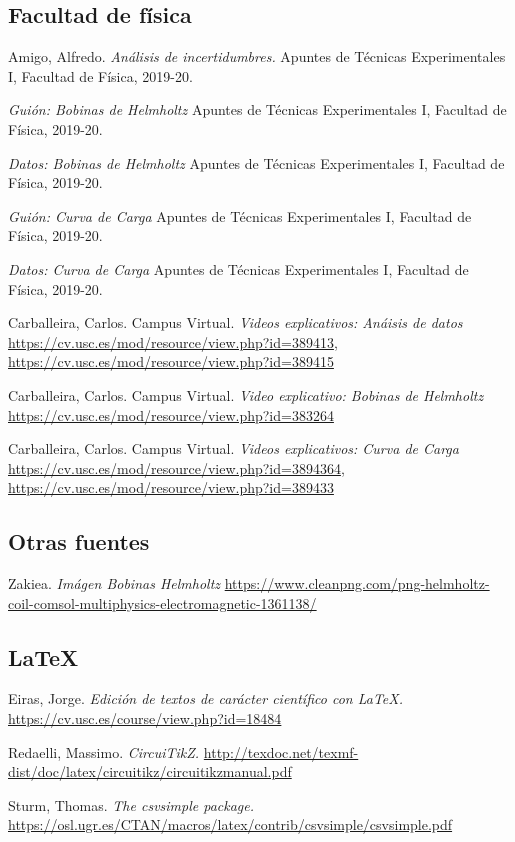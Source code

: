 \documentclass[12pt, a4paper, titlepage]{article}
\begin{document}
  \subsection*{Facultad de física}

  Amigo, Alfredo. \textit{Análisis de incertidumbres.} Apuntes de Técnicas Experimentales I, Facultad de Física, 2019-20.

  \textit{Guión: Bobinas de Helmholtz} Apuntes de Técnicas Experimentales I, Facultad de Física, 2019-20.

  \textit{Datos: Bobinas de Helmholtz} Apuntes de Técnicas Experimentales I, Facultad de Física, 2019-20.

  \textit{Guión: Curva de Carga} Apuntes de Técnicas Experimentales I, Facultad de Física, 2019-20.

  \textit{Datos: Curva de Carga} Apuntes de Técnicas Experimentales I, Facultad de Física, 2019-20.

  Carballeira, Carlos. Campus Virtual. \textit{Videos explicativos: Anáisis de datos} \url{https://cv.usc.es/mod/resource/view.php?id=389413}, \url{https://cv.usc.es/mod/resource/view.php?id=389415}

  Carballeira, Carlos. Campus Virtual. \textit{Video explicativo: Bobinas de Helmholtz} \url{https://cv.usc.es/mod/resource/view.php?id=383264}

  Carballeira, Carlos. Campus Virtual. \textit{Videos explicativos: Curva de Carga} \url{https://cv.usc.es/mod/resource/view.php?id=3894364}, \url{https://cv.usc.es/mod/resource/view.php?id=389433}

  \subsection*{Otras fuentes}

  Zakiea. \textit{Imágen Bobinas Helmholtz} \url{https://www.cleanpng.com/png-helmholtz-coil-comsol-multiphysics-electromagnetic-1361138/}

  \subsection*{LaTeX}

  Eiras, Jorge. \textit{Edición de textos de carácter científico con LaTeX.} \url{https://cv.usc.es/course/view.php?id=18484}

  Redaelli, Massimo. \textit{CircuiTikZ.} \url{http://texdoc.net/texmf-dist/doc/latex/circuitikz/circuitikzmanual.pdf}

  Sturm, Thomas. \textit{The csvsimple package.} \url{https://osl.ugr.es/CTAN/macros/latex/contrib/csvsimple/csvsimple.pdf}
\end{document}
